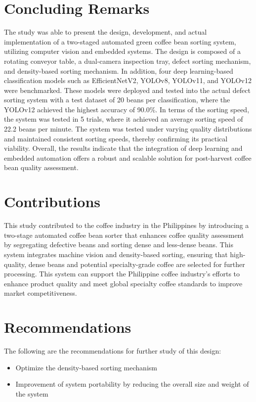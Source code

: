 \section{Concluding Remarks}

The study was able to present the design, development, and actual implementation of a two-staged automated green coffee bean sorting system, utilizing computer vision and embedded systems. The design is composed of a rotating conveyor table, a dual-camera inspection tray, defect sorting mechanism, and density-based sorting mechanism. In addition, four deep learning-based classification models such as EfficientNetV2, YOLOv8, YOLOv11, and YOLOv12 were benchmarked. These models were deployed and tested into the actual defect sorting system with a test dataset of 20 beans per classification, where the YOLOv12 achieved the highest accuracy of 90.0\%. In terms of the sorting speed, the system was tested in 5 trials, where it achieved an average sorting speed of 22.2 beans per minute. The system was tested under varying quality distributions and maintained consistent sorting speeds, thereby confirming its practical viability. Overall, the results indicate that the integration of deep learning and embedded automation offers a robust and scalable solution for post-harvest coffee bean quality assessment.

\section{Contributions}
This study contributed to the coffee industry in the Philippines by introducing a two-stage automated coffee bean sorter that enhances coffee quality assessment by segregating defective beans and sorting dense and less-dense beans. This system integrates machine vision and density-based sorting, ensuring that high-quality, dense beans and potential specialty-grade coffee are selected for further processing. This system can support the Philippine coffee industry’s efforts to enhance product quality and meet global specialty coffee standards to improve market competitiveness. 


\section{Recommendations}
The following are the recommendations for further study of this design:
\begin{itemize}
    \item Optimize the density-based sorting mechanism
    \item Improvement of system portability by reducing the overall size and weight of the system
\end{itemize}

